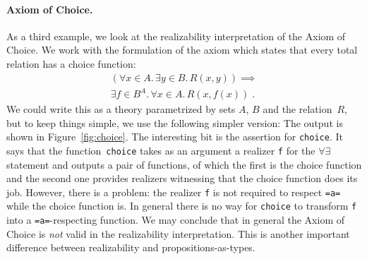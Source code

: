 \begin{figure*}
  \centering
  {}
  \caption{Output for theory \texttt{Nat}}
  \label{fig:nat}
\end{figure*}


\paragraph{Axiom of Choice.}
\label{sec:axiom-choice}

As a third example, we look at the realizability interpretation of the
Axiom of Choice. We work with the formulation of the axiom which
states that every total relation has a choice function:
%
\begin{multline*}
  (\forall x \in A .\,
   \exists y \in B .\, R(x, y)) \implies \\
  \exists f \in B^A .\,
  \forall x \in A .\, R(x, f(x)) \;.
\end{multline*}
%
We could write this as a theory parametrized by sets $A$, $B$ and the
relation~$R$, but to keep things simple, we use the following simpler
version:
%
{\small{}}%
%
The output is shown in Figure~\ref{fig:choice}. The interesting bit is
the assertion for \Verb|choice|. It says that the
function~\Verb|choice| takes as an argument a realizer \Verb|f| for
the $\forall\exists$ statement and outputs a pair of functions, of
which the first is the choice function and the second one provides
realizers witnessing that the choice function does its job. However,
there is a problem: the realizer \Verb|f| is not required to respect
\Verb|=a=| while the choice function is. In general there is no way
for \Verb|choice| to transform \Verb|f| into a \Verb|=a=|-respecting
function. We may conclude that in general the Axiom of Choice is
\emph{not} valid in the realizability interpretation. This is another
important difference between realizability and propositions-as-types.

\begin{figure*}
  \centering
  {\small {}}
  \caption{Output for theory \texttt{Choice}}
  \label{fig:choice}
\end{figure*}


